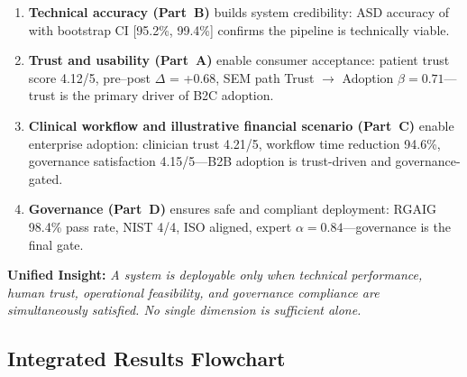 \begin{enumerate}[label=\textbf{\arabic*.}, leftmargin=2cm]
    \item \textbf{Technical accuracy (Part~B)} builds system credibility: ASD accuracy of \asdacc{} with bootstrap CI [95.2\%, 99.4\%] confirms the pipeline is technically viable.
    \item \textbf{Trust and usability (Part~A)} enable consumer acceptance: patient trust score 4.12/5, pre--post $\Delta$ = +0.68, SEM path Trust $\to$ Adoption $\beta = 0.71$---trust is the primary driver of B2C adoption.
    \item \textbf{Clinical workflow and illustrative financial scenario (Part~C)} enable enterprise adoption: clinician trust 4.21/5, workflow time reduction 94.6\%, governance satisfaction 4.15/5---B2B adoption is trust-driven and governance-gated.
    \item \textbf{Governance (Part~D)} ensures safe and compliant deployment: RGAIG 98.4\% pass rate, NIST 4/4, ISO aligned, expert $\alpha = 0.84$---governance is the final gate.
\end{enumerate}

\noindent\textbf{Unified Insight:} \textit{A system is deployable only when technical performance, human trust, operational feasibility, and governance compliance are simultaneously satisfied. No single dimension is sufficient alone.}

\subsection{Integrated Results Flowchart}

